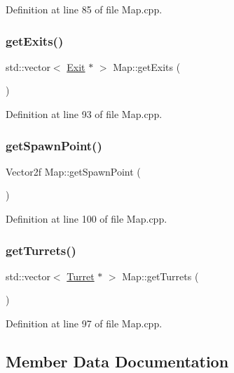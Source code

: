 Definition at line 85 of file Map.\+cpp.

\mbox{\label{class_map_a1c3f034c6072fe1103626cd9f5685094}} 
\subsubsection{\texorpdfstring{get\+Exits()}{getExits()}}
{\footnotesize\ttfamily std\+::vector$<$ \hyperlink{class_exit}{Exit} $\ast$ $>$ Map\+::get\+Exits (\begin{DoxyParamCaption}{ }\end{DoxyParamCaption})}



Definition at line 93 of file Map.\+cpp.

\mbox{\label{class_map_a15095789dcc043bbed23092f37447731}} 
\subsubsection{\texorpdfstring{get\+Spawn\+Point()}{getSpawnPoint()}}
{\footnotesize\ttfamily Vector2f Map\+::get\+Spawn\+Point (\begin{DoxyParamCaption}{ }\end{DoxyParamCaption})}



Definition at line 100 of file Map.\+cpp.

\mbox{\label{class_map_ab8f9839fd7d6e6838772cbad9cc9dc34}} 
\subsubsection{\texorpdfstring{get\+Turrets()}{getTurrets()}}
{\footnotesize\ttfamily std\+::vector$<$ \hyperlink{class_turret}{Turret} $\ast$ $>$ Map\+::get\+Turrets (\begin{DoxyParamCaption}{ }\end{DoxyParamCaption})}



Definition at line 97 of file Map.\+cpp.



\subsection{Member Data Documentation}
\mbox{\label{class_map_ae0b54e9c9926c2b9a369e351a8f6e7b7}} 

